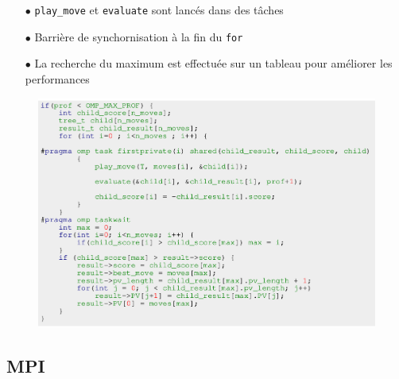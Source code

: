 \documentclass[usepdftitle=false,green]{beamer}
\begin{document}
\begin{frame}
    \begin{itemize}
        \item[$\bullet$] \texttt{play\_move} et \texttt{evaluate} sont lancés dans des tâches
        \item[$\bullet$] Barrière de synchornisation à la fin du \texttt{for}
        \item[$\bullet$] La recherche du maximum est effectuée sur un tableau pour améliorer les performances
    \end{itemize}
    \begin{center}
        \begin{figure}
            \includegraphics[scale=0.2]{pics/code3.png}
        \end{figure}
    \end{center}
\end{frame}

    \subsection{MPI}
\end{document}
